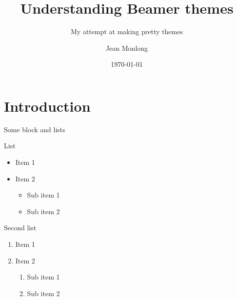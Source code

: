 \documentclass{beamer}
\title{Understanding Beamer themes}
\subtitle{My attempt at making pretty themes}
\author{Jean Monlong}
\institute{Human Genetics Dept.\\McGill University}
\date{\today}
\begin{document}
\begin{frame}
  \titlepage
\end{frame}

\section{Introduction}

\begin{frame}{Some block and lists}
  \begin{block}{List}
    \begin{itemize}
    \item Item 1
    \item Item 2
      \begin{itemize}
      \item Sub item 1
      \item Sub item 2
      \end{itemize}
    \end{itemize}
  \end{block}

  \begin{block}{Second list}
    \begin{enumerate}
    \item Item 1
    \item Item 2
      \begin{enumerate}
      \item Sub item 1
      \item Sub item 2
      \end{enumerate}
    \end{enumerate}
  \end{block}
  
\end{frame}
\end{document}
